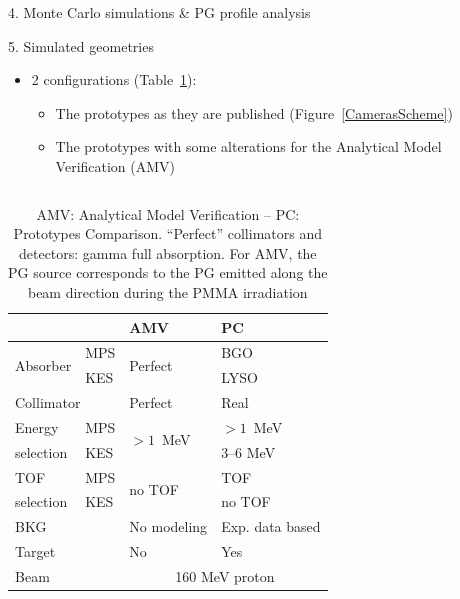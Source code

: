 \documentclass[final]{beamer} %
\begin{document}
\begin{frame}{}
\begin{columns}[t]
\begin{column}{0.49\textwidth}
\begin{block}{4. Monte Carlo simulations \& PG profile analysis}
	  \end{block}		
		
		\begin{block}{5. Simulated geometries}
		
					\begin{itemize}
						\item 2 configurations (Table~\ref{CamerasParameters}):
						\begin{itemize}
							\item The prototypes as they are published (Figure~\ref{CamerasScheme})
							\item The prototypes with some alterations for the Analytical Model Verification (AMV)
						\end{itemize}
					\end{itemize}	
					\vspace{-15mm}
			\begin{columns}[t]
				\begin{column}{0.45\textwidth}			
			
					\begin{table}[h]
						\centering
						\small
						\begin{tabular}{|l|l|l|l|}
							\hline
							\multicolumn{2}{|c|}{}& 	AMV  & PC\\
							\hline
							\multirow{2}{*}{Absorber}	& MPS & \multirow{2}{*}{Perfect} 							& BGO \\
							\cline{2-2}\cline{4-4}
															& KES & 																& LYSO \\
							\hline
							\multicolumn{2}{|l|}{Collimator} & Perfect		&	Real					\\															
							\hline
							Energy & MPS & \multirow{2}{*}{$>1$~MeV}			&	$>1$~MeV						\\
							\cline{2-2}\cline{4-4}
							selection				& KES & & 3--6 MeV \\
							\hline	
							TOF & MPS & \multirow{2}{*}{no TOF}			&		TOF						\\
							\cline{2-2}\cline{4-4}
							selection				& KES & & no TOF \\
							\hline		
							\multicolumn{2}{|l|}{BKG} & No modeling & Exp. data based   \\
							\hline
							\multicolumn{2}{|l|}{Target} & No & Yes   \\			
							\hline
							\multicolumn{2}{|l|}{Beam} & \multicolumn{2}{|c|}{160 MeV proton}   \\								
							\hline		
						\end{tabular}
						\caption{AMV: Analytical Model Verification -- PC: Prototypes Comparison. \enquote{Perfect} collimators and detectors: gamma full absorption. For AMV, the PG source corresponds to the PG emitted along the beam direction during the PMMA irradiation }
						\label{CamerasParameters}
						\end{table}
				\end{column}			


\end{columns}
\end{block}
\end{column}
\end{columns}
\end{frame}
\end{document}
